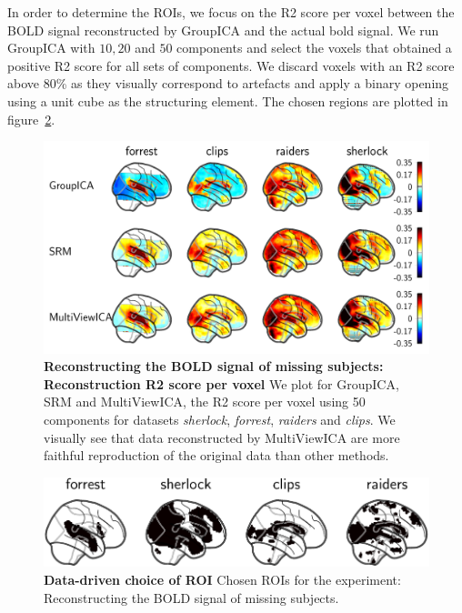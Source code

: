 \documentclass{report}
\begin{document}
{In order to determine the ROIs, we focus on the R2 score per voxel between the BOLD signal reconstructed by GroupICA and the actual bold signal. We run GroupICA with $10, 20$ and $50$ components and select the voxels that obtained a positive R2 score for all sets of components.
%
We discard voxels with an R2 score above 80\% as they visually correspond to artefacts and apply a binary opening using a unit cube as the structuring element. The chosen regions are plotted in figure~\ref{fig:roi}.

\begin{figure}
  \centering
  \includegraphics[width=\textwidth]{figures/mvica/reconstruction_score_fullbrain.pdf}
  \caption{\textbf{Reconstructing the BOLD signal of missing subjects: Reconstruction R2 score per voxel} We plot for GroupICA, SRM and MultiViewICA, the R2 score per voxel using 50 components for datasets \emph{sherlock}, \emph{forrest}, \emph{raiders} and \emph{clips}. We visually see that data reconstructed by MultiViewICA are more faithful reproduction of the original data than other methods.}
  \label{fig:brainmaps}
\end{figure}

\begin{figure}
  \centering
  \includegraphics[width=\textwidth]{figures/mvica/reconstruction_score_roi.pdf}
  \caption{\textbf{Data-driven choice of ROI} Chosen ROIs for the experiment: Reconstructing the BOLD signal of missing subjects.}
  \label{fig:roi}
\end{figure}

}
\end{document}
